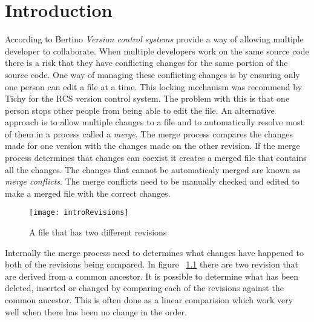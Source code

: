 
\chapter{Introduction}\label{C:intro}

According to Bertino \cite{Bertino2012} \emph{Version control systems} provide a way of allowing multiple developer to collaborate. When multiple developers work on the same source code there is a risk that they have conflicting changes for the same portion of the source code.  One way of managing these conflicting changes is by ensuring only one person can edit a file at a time. This locking mechanism was recommend by Tichy \cite{Tichy1982} for the RCS version control system. The problem with this is that one person stops other people from being able to edit the file. An alternative approach is to allow multiple changes to a file and to automatically resolve most of them in a process called a \emph{merge}.  The merge process compares the changes made for one version with the changes made on the other revision. If the merge process determines that changes can coexist it creates a merged file that contains all the changes. The changes that cannot be automaticaly merged are known as \emph{merge conflicts}.  The merge conflicts need to be manually checked and edited to make a merged file with the correct changes.

\begin{figure}[h]
 \begin{center}
 \texttt{[image: introRevisions]}
 \end{center}
 \caption{A file that has two different revisions}
 \label{fig:introRevisions}
\end{figure}


Internally the merge process need to determines what changes have happened to both of the revisions being compared.   In figure  ~\ref{fig:introRevisions} there are two revision that are derived from a common ancestor. It is possible to determine what has been deleted, inserted or changed by comparing each of the revisions against the common ancestor.  This is often done as a linear comparision which work very well when there has been no change in the order.

